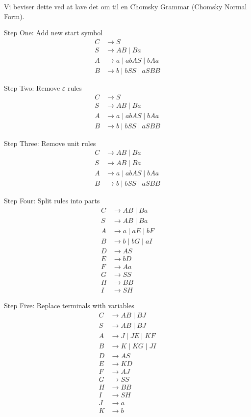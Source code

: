 Vi beviser dette ved at lave det om til en Chomsky Grammar (Chomsky Normal Form).

Step One: Add new start symbol
\begin{align*}
	C & \to S                    \\
	S & \to AB \mid Ba           \\
	A & \to a \mid abAS \mid bAa \\
	B & \to b \mid bSS \mid aSBB
\end{align*}

Step Two: Remove \(\varepsilon\) rules
\begin{align*}
	C & \to S                    \\
	S & \to AB \mid Ba           \\
	A & \to a \mid abAS \mid bAa \\
	B & \to b \mid bSS \mid aSBB
\end{align*}

Step Three: Remove unit rules
\begin{align*}
	C & \to AB \mid Ba           \\
	S & \to AB \mid Ba           \\
	A & \to a \mid abAS \mid bAa \\
	B & \to b \mid bSS \mid aSBB
\end{align*}

Step Four: Split rules into parts
\begin{align*}
	C & \to AB \mid Ba        \\
	S & \to AB \mid Ba        \\
	A & \to a \mid aE \mid bF \\
	B & \to b \mid bG \mid aI \\
	D & \to AS                \\
	E & \to bD                \\
	F & \to Aa                \\
	G & \to SS                \\
	H & \to BB                \\
	I & \to SH
\end{align*}

Step Five: Replace terminals with variables
\begin{align*}
	C & \to AB \mid BJ        \\
	S & \to AB \mid BJ        \\
	A & \to J \mid JE \mid KF \\
	B & \to K \mid KG \mid JI \\
	D & \to AS                \\
	E & \to KD                \\
	F & \to AJ                \\
	G & \to SS                \\
	H & \to BB                \\
	I & \to SH                \\
	J & \to a                 \\
	K & \to b
\end{align*}

